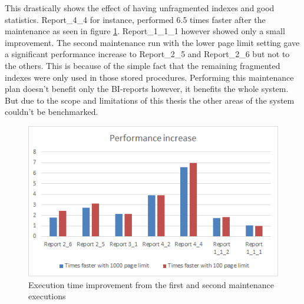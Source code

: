 \documentclass{cslthse-msc}
\begin{document}
This drastically shows the effect of having unfragmented indexes and good statistics. Report\_4\_4 for instance, performed 6.5 times faster after the maintenance as seen in figure \ref{fig:beforeaftertimes}. Report\_1\_1\_1 however showed only a small improvement. The second maintenance run with the lower page limit setting gave a significant performance increase to Report\_2\_5 and Report\_2\_6 but not to the others. This is because of the simple fact that the remaining fragmented indexes were only used in those stored procedures. Performing this maintenance plan doesn't benefit only the BI-reports however, it benefits the whole system. But due to the scope and limitations of this thesis the other areas of the system couldn't be benchmarked.

\begin{figure}[H]
\begin{center}
\includegraphics[scale=1]{Pictures/beforeAndAfterMaintenancetimes.png}
\caption{Execution time improvement from the first and second maintenance executions}
\label{fig:beforeaftertimes}
\end{center}
\end{figure}
\end{document}
